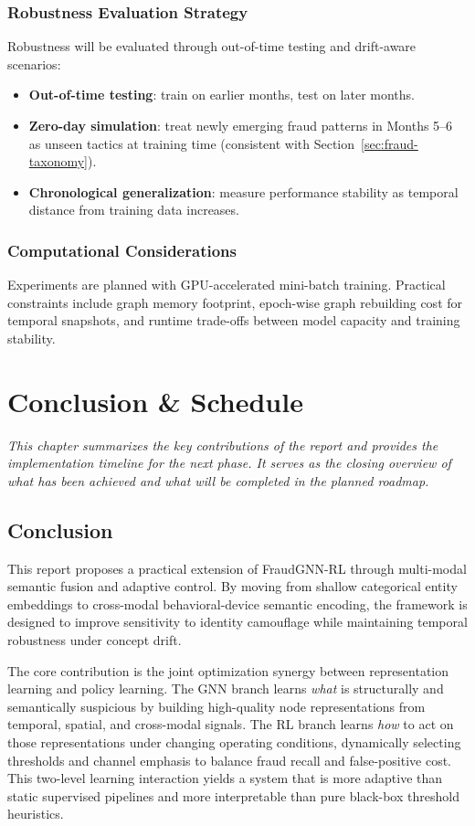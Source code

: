 \documentclass[12pt,a4paper]{report}
\newcommand{\chapterdesc}[1]{%
    \vspace{-0.6\baselineskip}
    \noindent\hspace*{1.5cm}\parbox{\dimexpr\textwidth-1.5cm\relax}{\textit{#1}}
    \par\vspace{0.3\baselineskip}
}
\begin{document}
\subsection{Robustness Evaluation Strategy}
Robustness will be evaluated through out-of-time testing and drift-aware scenarios:
\begin{itemize}
    \item \textbf{Out-of-time testing}: train on earlier months, test on later months.
    \item \textbf{Zero-day simulation}: treat newly emerging fraud patterns in Months 5--6 as unseen tactics at training time (consistent with Section~\ref{sec:fraud-taxonomy}).
    \item \textbf{Chronological generalization}: measure performance stability as temporal distance from training data increases.
\end{itemize}

\subsection{Computational Considerations}
Experiments are planned with GPU-accelerated mini-batch training. Practical constraints include graph memory footprint, epoch-wise graph rebuilding cost for temporal snapshots, and runtime trade-offs between model capacity and training stability.

\chapter{Conclusion \& Schedule}
\chapterdesc{This chapter summarizes the key contributions of the report and provides the implementation timeline for the next phase. It serves as the closing overview of what has been achieved and what will be completed in the planned roadmap.}

\section{Conclusion}
This report proposes a practical extension of FraudGNN-RL through multi-modal semantic fusion and adaptive control. By moving from shallow categorical entity embeddings to cross-modal behavioral-device semantic encoding, the framework is designed to improve sensitivity to identity camouflage while maintaining temporal robustness under concept drift.

The core contribution is the joint optimization synergy between representation learning and policy learning. The GNN branch learns \emph{what} is structurally and semantically suspicious by building high-quality node representations from temporal, spatial, and cross-modal signals. The RL branch learns \emph{how} to act on those representations under changing operating conditions, dynamically selecting thresholds and channel emphasis to balance fraud recall and false-positive cost. This two-level learning interaction yields a system that is more adaptive than static supervised pipelines and more interpretable than pure black-box threshold heuristics.
\end{document}
